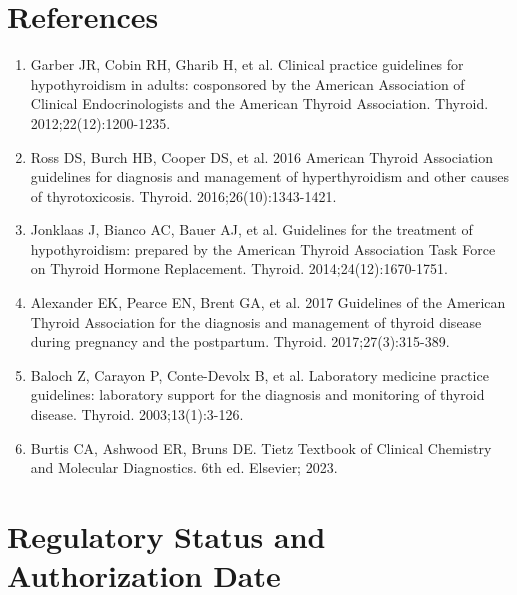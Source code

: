 \section*{References}
\begin{enumerate}
  \item Garber JR, Cobin RH, Gharib H, et al. Clinical practice guidelines for hypothyroidism in adults: cosponsored by the American Association of Clinical Endocrinologists and the American Thyroid Association. Thyroid. 2012;22(12):1200-1235.
  \item Ross DS, Burch HB, Cooper DS, et al. 2016 American Thyroid Association guidelines for diagnosis and management of hyperthyroidism and other causes of thyrotoxicosis. Thyroid. 2016;26(10):1343-1421.
  \item Jonklaas J, Bianco AC, Bauer AJ, et al. Guidelines for the treatment of hypothyroidism: prepared by the American Thyroid Association Task Force on Thyroid Hormone Replacement. Thyroid. 2014;24(12):1670-1751.
  \item Alexander EK, Pearce EN, Brent GA, et al. 2017 Guidelines of the American Thyroid Association for the diagnosis and management of thyroid disease during pregnancy and the postpartum. Thyroid. 2017;27(3):315-389.
  \item Baloch Z, Carayon P, Conte-Devolx B, et al. Laboratory medicine practice guidelines: laboratory support for the diagnosis and monitoring of thyroid disease. Thyroid. 2003;13(1):3-126.
  \item Burtis CA, Ashwood ER, Bruns DE. Tietz Textbook of Clinical Chemistry and Molecular Diagnostics. 6th ed. Elsevier; 2023.
\end{enumerate}

\clearpage
\section*{Regulatory Status and Authorization Date}

\clearpage
